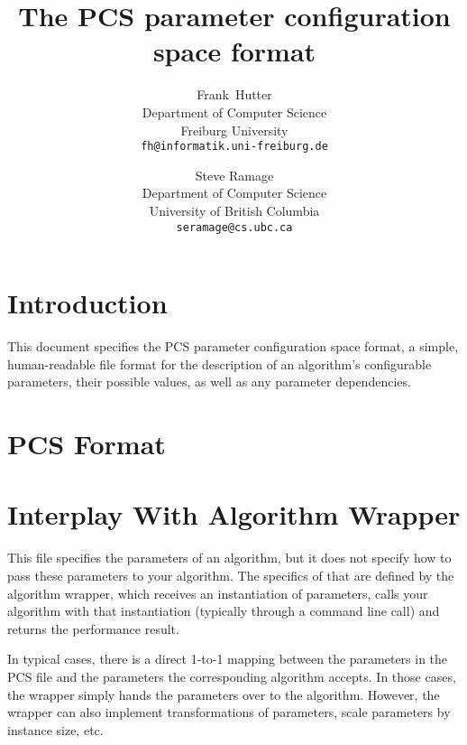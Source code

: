 \documentclass[11pt,letterpaper,oneside]{article}
\begin{document}
\title{The PCS parameter configuration space format}

\author{
Frank~Hutter\\ 
Department of Computer Science\\
Freiburg University\\
\texttt{fh@informatik.uni-freiburg.de}
\and
Steve Ramage\\
Department of Computer Science\\
University of British Columbia\\
\texttt{seramage@cs.ubc.ca}
}

\maketitle

\section{Introduction}

\noindent{}This document specifies the PCS parameter configuration space format, a simple, 
human-readable file format for the description of an algorithm's configurable parameters, 
their possible values, as well as any parameter dependencies.
%
\section{PCS Format}



\section{Interplay With Algorithm Wrapper}\label{sec:tips}
This file specifies the parameters of an algorithm, but it does not specify how to pass these parameters to your algorithm.
The specifics of that are defined by the algorithm wrapper, which receives an instantiation of parameters,
calls your algorithm with that instantiation (typically through a command line call) and returns the performance result. 

In typical cases, there is a direct 1-to-1 mapping between the parameters in the PCS file and the parameters the corresponding algorithm accepts.
In those cases, the wrapper simply hands the parameters over to the algorithm.
However, the wrapper can also implement transformations of parameters, scale parameters by instance size, etc.
\end{document}
